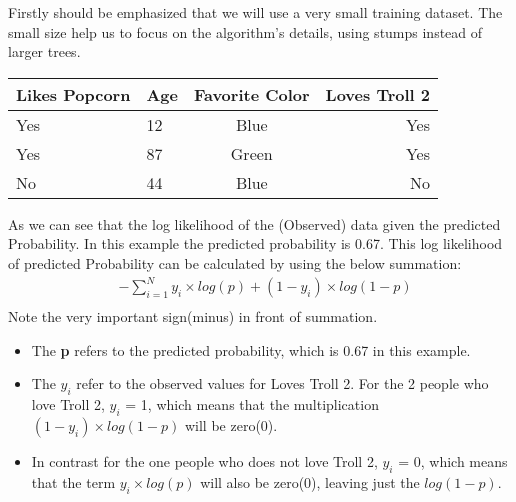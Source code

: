 \documentclass[12pt, a4paper]{article} %
\begin{document}
Firstly should be emphasized that we will use a very small training dataset. The small size help us to focus on the algorithm's details, using stumps instead of larger trees.

\begin{table}[h!]
\begin{center}
\begin{tabular}{m|l|c|r} %
    
    \hline
    \hline
    
         \textbf{Likes Popcorn}
     
       & \textbf{Age}
      
       & \textbf{Favorite Color}
       
       & \textbf{Loves Troll 2}
       
      \\
      
      \hline
      \hline
      
      Yes & 12  & Blue  & Yes\\
      Yes & 87  & Green & Yes\\
      No  & 44  & Blue  & No\\
      
      \hline
      \hline
      
\end{tabular}
\end{center}
\end{table}


As we can see that the  log likelihood of the (Observed) data given the predicted Probability. In this example the predicted probability is 0.67. This log likelihood of predicted Probability can be calculated by using the below summation:
\begin{align*}
    & - \sum_{i = 1}^{N} y_{i} \times log(p) + (1 - y_{i}) \times log(1 - p)\\
\end{align*}
Note the very important sign(minus) in front of summation.
\begin{itemize}
    \item The \textbf{p} refers to the predicted probability, which is 0.67 in this example.
    \item The $y_{i}$ refer to the observed values for Loves Troll 2. For the 2 people who love Troll 2, $y_{i}$ = 1, which means that the multiplication $(1 - y_{i}) \times log(1 - p)$ will be zero(0).
    \item In contrast for the one people who does not love Troll 2, $y_{i}$ = 0, which means that the term $y_{i} \times log(p)$ will also be zero(0), leaving just the $log(1 - p)$.
\end{itemize}
\end{document}

